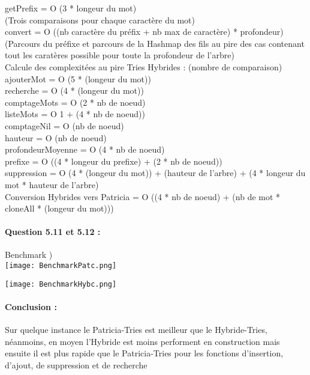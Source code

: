 \documentclass{article}
\begin{document}
getPrefix = O (3 * longeur du mot)\\
(Trois comparaisons pour chaque caractère du mot)\\

convert = O ((nb caractère du préfix + nb max de caractère) * profondeur)\\
(Parcours du préfixe et parcours de la Hashmap des fils au pire des cas
contenant tout les caratères possible pour toute la profondeur de l'arbre)\\

Calcule des complexitées au pire Tries Hybrides : (nombre de comparaison)\\

ajouterMot = O (5 * (longeur du mot))\\

recherche = O (4 * (longeur du mot))\\

comptageMots = O (2 * nb de noeud)\\

listeMots = O 1 + (4 * nb de noeud))\\

comptageNil = O (nb de noeud)\\

hauteur = O (nb de noeud)\\

profondeurMoyenne = O (4 * nb de noeud)\\

prefixe = O ((4 * longeur du prefixe) + (2 * nb de noeud))\\

suppression = O (4 * (longeur du mot)) + (hauteur de l'arbre) + (4 *
longeur du mot * hauteur de l'arbre)\\

Conversion Hybrides vers Patricia = O ((4 * nb de noeud) + (nb de mot *
cloneAll * (longeur du mot)))\\

\newpage
\paragraph{Question 5.11 et 5.12 :}

Benchmark )\\

\texttt{[image: BenchmarkPatc.png]}

\texttt{[image: BenchmarkHybc.png]}

\paragraph{Conclusion :}

Sur quelque instance le Patricia-Tries est meilleur que le Hybride-Tries,
néanmoins, en moyen l'Hybride est moins performent en construction mais ensuite
il est plus rapide que le Patricia-Tries pour les fonctions d'insertion,
d'ajout, de suppression et de recherche
\end{document}
